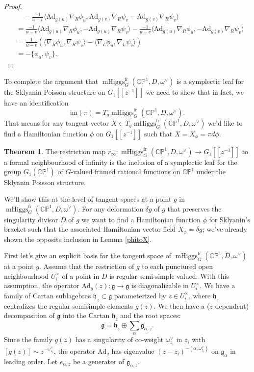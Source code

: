 \documentclass[11pt, oneside, reqno]{amsart}
\theoremstyle{definition} \newtheorem{definition}{Definition}[section]
\newtheorem{theorem}[definition]{Theorem}
\theoremstyle{definition} \newtheorem{remark}[definition]{Remark}
\theoremstyle{definition} \newtheorem{remarks}[definition]{Remarks}
\theoremstyle{definition} \newtheorem{question}[definition]{Question}
\theoremstyle{definition} \newtheorem*{note}{Note}
\theoremstyle{definition} \newtheorem{example}[definition]{Example}
\theoremstyle{definition} \newtheorem{examples}[definition]{Examples}
\renewcommand{\gg}{\mathfrak{g}}
\newcommand{\hh}{\mathfrak{h}}
\newcommand{\bb}[1]{\mathbb{#1}}
\newcommand{\mr}[1]{\mathrm{#1}}
\DeclareMathOperator{\mhiggs}{mHiggs}
\newcommand{\fr}{\mathrm{fr}}
\newcommand{\Ad}{\mr{Ad}}
\begin{document}
\begin{proof}
\begin{align*}
   &\quad - \frac{-1}{u - v}  \langle \Ad_{g(u)} \nabla_{R} \phi_{u} , \Ad_{g(v)} \nabla_{R} \psi_{v}  - \Ad_{g(v)} \nabla_{R} \psi_{v}   \rangle \\
      &=   \frac{-1}{u - v}  \langle \Ad_{g(u)} \nabla_{R} \phi_{u} ,  - \Ad_{g(u)} \nabla_{R} \psi_{v} \rangle   - \frac{-1}{u - v}  \langle \Ad_{g(u)} \nabla_{R} \phi_{u} ,  - \Ad_{g(v)} \nabla_{R} \psi_{v}   \rangle \\
   &= \frac{1}{u - v} (\langle \nabla_{R} \phi_{u} , \nabla_{R} \psi_{v}\rangle - 
   \langle  \nabla_{L} \phi_{u} , \nabla_{L} \psi_{v} \rangle ) \\
   &=  - \{\phi_{u}, \psi_{v} \}.
  \end{align*}
\end{proof}

To complete the argument that $\mhiggs^\fr_G(\bb{CP}^1, D, \omega^\vee)$ is a symplectic leaf for the Sklyanin Poisson structure on $G_1[[z^{-1}]]$ we need to show that in fact, we have an identification 
\[\mr{im}(\pi) = T_g \mhiggs^\fr_G(\bb{CP}^1, D, \omega^\vee).\]
That means for any tangent vector $X \in T_g \mhiggs^\fr_G(\bb{CP}^1, D, \omega^\vee)$ we'd like to find a Hamiltonian
function $\phi$ on $G_1[[z^{-1}]]$ such that $X = X_{\phi} = \pi d \phi$.

\begin{theorem}\label{theorem:symplectic_leaf}
The restriction map $r_\infty \colon \mhiggs^\fr_G(\bb{CP}^1, D, \omega^\vee) \to G_1[[z^{-1}]]$ to a formal neighbourhood of infinity is the inclusion of a symplectic leaf for the group $G_1(\bb{CP}^1)$ of $G$-valued framed rational functions on $\bb{CP}^1$ under the Sklyanin Poisson structure.
\end{theorem}

We'll show this at the level of tangent spaces at a point $g$ in $\mhiggs^\fr_G(\bb{CP}^1, D, \omega^\vee)$.  For any deformation $\delta g $ of $g$ that preserves the singularity divisor $D$ of $g$ we want to find a Hamiltonian function $\phi$ for Sklyanin's bracket such that the associated Hamiltonian vector field $X_\phi = \delta g$; we've already shown the opposite inclusion in Lemma \ref{phitoX}.

First let's give an explicit basis for the tangent space of $\mhiggs^\fr_G(\bb{CP}^1, D, \omega^\vee)$ at a point $g$.  Assume that the restriction of $g$ to each punctured open neighbourhood $U^\times_i$ of a point in $D$ is regular semi-simple valued.  With this assumption, the operator $\Ad_{g}(z): \gg \to \gg$ is diagonalizable in $U_{i}^{\times}$.  We have a family of Cartan sublagebras $\hh_{z} \subset \gg$ parameterized by $z \in U_{i}^{\times}$, where $\hh_z$ centralizes the regular semisimple elements $g(z)$.  We then have a ($z$-dependent) decomposition of $\gg$ into the Cartan $\hh_z$ and the root spaces:
\[\gg = \hh_{z} \oplus \sum_{\alpha} \gg_{\alpha,z}.\]
Since the family $g(z)$ has a singularity of co-weight $\omega_{z_i}^{\vee}$ in $z_i$ with $[g(z)] \sim z^{-\omega_{z_i}^{\vee}}$, the operator $\Ad_{g}$ has eigenvalue $ (z - z_i)^{- (\alpha, \omega^{\vee}_{z_i})}$ on $\gg_{\alpha}$
in leading order. Let $e_{\alpha, z}$ be a generator of $\gg_{\alpha, z}$.
\end{document}
